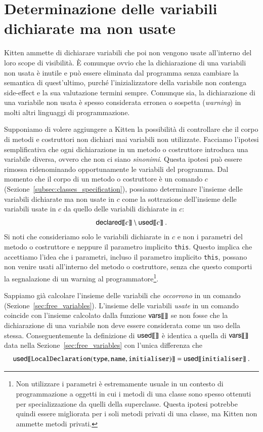 \section{Determinazione delle variabili dichiarate ma non usate}
  \label{sec:no_use}
%
Kitten ammette di dichiarare variabili che poi non vengono usate all'interno
del loro scope di visibilit\`a. \`E comunque ovvio che la dichiarazione di
una variabili non usata \`e inutile e pu\`o essere eliminata dal programma
senza cambiare la semantica di quest'ultimo,
purch\'e l'inizializzatore della variabile non
contenga side-effect e la sua valutazione termini sempre.
Comunque sia, la dichiarazione
di una variabile non usata \`e spesso considerata erronea o sospetta
(\emph{warning}) in molti altri linguaggi di programmazione.

Supponiamo di volere aggiungere a Kitten la possibilit\`a di controllare
che il corpo di metodi e costruttori non dichiari mai variabili non utilizzate.
Facciamo l'ipotesi semplificativa che ogni dichiarazione in un metodo o
costruttore introduca una variabile diversa, ovvero che non ci siano
\emph{sinonimi}. Questa ipotesi pu\`o essere rimossa ridenominando
opportunamente le variabili del programma.
Dal momento che il corpo di un metodo o costruttore \`e un comando $c$
(Sezione~\ref{subsec:classes_specification}), possiamo determinare l'insieme
delle variabili dichiarate ma non usate in $c$ come la sottrazione dell'insieme
delle variabili usate in $c$ da quello delle variabili dichiarate in $c$:
\[
  {\mathsf{declared}[\![{c}]\!]}\setminus{\mathsf{used}[\![{c}]\!]}~.
\]
Si noti che consideriamo solo le variabili dichiarate in $c$ e non
i parametri del metodo o costruttore e neppure il parametro implicito
\texttt{this}.
Questo implica che accettiamo l'idea che i parametri,
incluso il parametro implicito \texttt{this}, possano non venire usati
all'interno del metodo o costruttore, senza che questo comporti la segnalazione
di un warning al programmatore\footnote{Non utilizzare i parametri \`e
estremamente usuale in un contesto di programmazione a oggetti in cui i metodi
di una classe sono
spesso ottenuti per specializzazione da quelli della superclasse. Questa
ipotesi potrebbe quindi essere migliorata per i soli metodi privati di una
classe, ma Kitten non ammette metodi privati.}.

Sappiamo gi\`a calcolare l'insieme delle variabili che \emph{occorrono}
in un comando (Sezione~\ref{sec:free_variables}). L'insieme delle variabili
\emph{usate} in un comando coincide con l'insieme calcolato dalla funzione
${\mathsf{vars}[\![{}]\!]}$ se non fosse che la dichiarazione di una variabile non deve essere
considerata come un uso della stessa. Conseguentemente la definizione
di ${\mathsf{used}[\![{}]\!]}$ \`e identica a quella di ${\mathsf{vars}[\![{}]\!]}$ data nella
Sezione~\ref{sec:free_variables} con l'unica differenza che
\[
  {\mathsf{used}[\![{\mathtt{LocalDeclaration(type,name,initialiser)}}]\!]}
    ={\mathsf{used}[\![{\mathtt{initialiser}}]\!]}~.
\]

